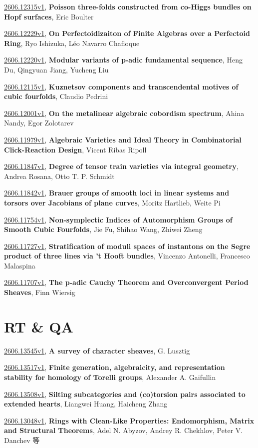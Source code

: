 \documentclass[9pt, a4paper]{article}
\theoremstyle{plain}
\theoremstyle{definition}
\theoremstyle{remark}
\newcommand{\arxiv}[3]{\href{https://arxiv.org/abs/#1}{#1}, \textbf{\textcolor{arxivblue}{#2}}, #3}
\begin{document}
\arxiv{2606.12315v1}{Poisson three-folds constructed from co-Higgs bundles on Hopf surfaces}{Eric Boulter}

\arxiv{2606.12229v1}{On Perfectoidizaiton of Finite Algebras over a Perfectoid Ring}{Ryo Ishizuka, Léo Navarro Chafloque}

\arxiv{2606.12220v1}{Modular variants of p-adic fundamental sequence}{Heng Du, Qingyuan Jiang, Yucheng Liu}

\arxiv{2606.12115v1}{Kuznetsov components and transcendental motives of cubic fourfolds}{Claudio Pedrini}

\arxiv{2606.12001v1}{On the metalinear algebraic cobordism spectrum}{Ahina Nandy, Egor Zolotarev}

\arxiv{2606.11979v1}{Algebraic Varieties and Ideal Theory in Combinatorial Click-Reaction Design}{Vicent Ribas Ripoll}

\arxiv{2606.11847v1}{Degree of tensor train varieties via integral geometry}{Andrea Rosana, Otto T. P. Schmidt}

\arxiv{2606.11842v1}{Brauer groups of smooth loci in linear systems and torsors over Jacobians of plane curves}{Moritz Hartlieb, Weite Pi}

\arxiv{2606.11754v1}{Non-symplectic Indices of Automorphism Groups of Smooth Cubic Fourfolds}{Jie Fu, Shihao Wang, Zhiwei Zheng}

\arxiv{2606.11727v1}{Stratification of moduli spaces of instantons on the Segre product of three lines via 't Hooft bundles}{Vincenzo Antonelli, Francesco Malaspina}

\arxiv{2606.11707v1}{The p-adic Cauchy Theorem and Overconvergent Period Sheaves}{Finn Wiersig}


\section{RT \& QA}
\arxiv{2606.13545v1}{A survey of character sheaves}{G. Lusztig}

\arxiv{2606.13517v1}{Finite generation, algebraicity, and representation stability for homology of Torelli groups}{Alexander A. Gaifullin}

\arxiv{2606.13508v1}{Silting subcategories and (co)torsion pairs associated to extended hearts}{Liangwei Huang, Haicheng Zhang}

\arxiv{2606.13048v1}{Rings with Clean-Like Properties: Endomorphism, Matrix and Structural Theorems}{Adel N. Abyzov, Andrey R. Chekhlov, Peter V. Danchev 等}
\end{document}
